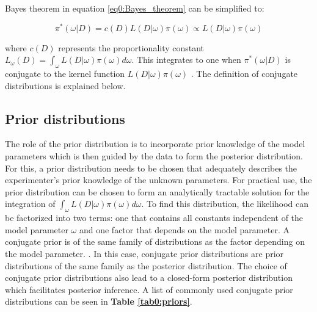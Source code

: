 Bayes theorem in equation \ref{eq0:Bayes_theorem} can be simplified to:

\begin{equation}
\pi^*(\omega|D)=c(D)L(D|\omega)\pi(\omega)\propto{}L(D|\omega)\pi(\omega)
\end{equation} 

where $c(D)$ represents the proportionality constant $L_\omega(D)=\int_\omega{}L(D|\omega)\pi(\omega)d\omega$. This integrates to one when $\pi^*(\omega|D)$ is conjugate to the kernel function $L(D|\omega)\pi(\omega)$ \citep{Bernardo2003, Raiffa1961}. The definition of conjugate distributions is explained below.  

\newpage

\subsection{Prior distributions}

The role of the prior distribution is to incorporate prior knowledge of the model parameters which is then guided by the data to form the posterior distribution. For this, a prior distribution needs to be chosen that adequately describes the experimenter's prior knowledge of the unknown parameters. For practical use, the prior distribution can be chosen to form an analytically tractable solution for the integration of $\int_\omega{}L(D|\omega)\pi(\omega)d\omega$. To find this distribution, the likelihood can be factorized into two terms: one that contains all constants independent of the model parameter $\omega$ and one factor that depends on the model parameter. A conjugate prior is of the same family of distributions as the factor depending on the model parameter. \citep{Fink1997}. In this case, conjugate prior distributions are prior distributions of the same family as the posterior distribution. The choice of conjugate prior distributions also lead to a closed-form posterior distribution which facilitates posterior inference. A list of commonly used conjugate prior distributions can be seen in \textbf{Table \ref{tab0:priors}}.

